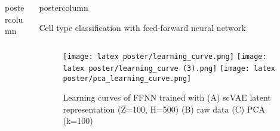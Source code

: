 \documentclass[final,hyperref={pdfpagelabels=false}]{beamer}
\newlength{\columnheight}
\begin{document}
\begin{frame}
\begin{columns}
\begin{column}{.49\paperwidth}
\begin{beamercolorbox}[center,wd=\textwidth]{postercolumn}
\begin{minipage}[T]{.99\textwidth}
{%
}
\end{minipage}
\end{beamercolorbox}
\end{column}
 

    
\begin{column}{.49\paperwidth}
\begin{beamercolorbox}[center,wd=\textwidth]{postercolumn}
\begin{minipage}[T]{.99\textwidth} %
\parbox[t][\columnheight]{\textwidth}{ %
            

\begin{block}{Cell type classification with feed-forward neural network}
\begin{columns}

\begin{column}{0.49\textwidth}
\centering

\begin{minipage}[t]{.95\textwidth}
\vspace{0.5cm}
\begin{figure}
\texttt{[image: latex poster/learning\_curve.png]}
\vspace{0.5cm}
\texttt{[image: latex poster/learning\_curve (3).png]}
\vspace{0.5cm}
\texttt{[image: latex poster/pca\_learning\_curve.png]}
 \caption{Learning curves of FFNN trained with (A) scVAE latent representation (Z=100, H=500) (B) raw data (C) PCA (k=100)}
 \label{figure:training}
\end{figure}  


\end{minipage}
\end{column}
\end{columns}
\end{block}}
\end{minipage}
\end{beamercolorbox}
\end{column}
\end{columns}
\end{frame}
\end{document}
